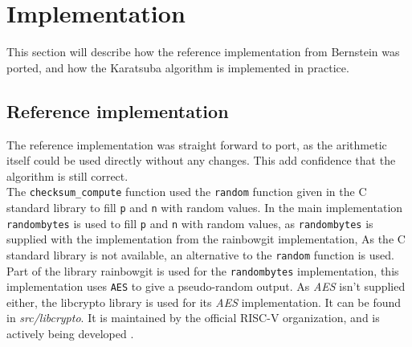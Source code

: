 \section{Implementation}
\label{section-Implementation}


This section will describe how the reference implementation from Bernstein was ported, and how the Karatsuba algorithm is implemented in practice.
\subsection{Reference implementation}
The reference implementation was straight forward to port, as the arithmetic itself could be used directly without any changes. This add confidence that the algorithm is still correct.\medskip
\\
The \texttt{checksum\_compute} function used the \texttt{random\(\)} function given in the C standard library to fill \texttt{p} and \texttt{n} with random values. In the main implementation \texttt{randombytes\(\)} is used to fill \texttt{p} and \texttt{n} with random values, as \texttt{randombytes\(\)} is supplied with the implementation from the rainbowgit implementation\cite{rainbowgit}, 
As the C standard library is not available, an alternative to the \texttt{random\(\)} function is used. Part of the library rainbowgit\cite{rainbowgit} is used for the \texttt{randombytes\(\)} implementation, this implementation uses \texttt{AES} to give a pseudo-random output. As \textit{AES} isn't supplied either, the libcrypto library\cite{libcrypto} is used for its \textit{AES} implementation. It can be found in \textit{src/libcrypto}. It is maintained by the official RISC-V organization, and is actively being developed \cite{libcrypto}.

